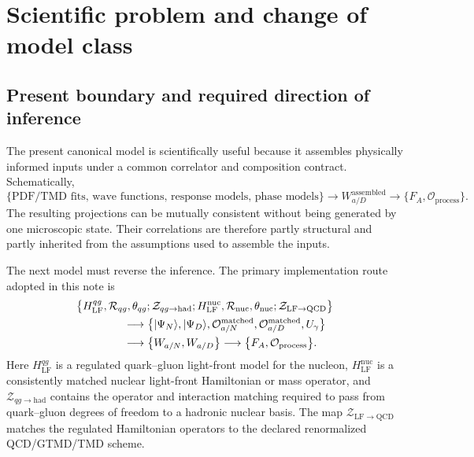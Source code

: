 \documentclass[11pt]{article}
\newcommand{\LF}{\mathrm{LF}}
\newcommand{\cO}{\mathcal O}
\newcommand{\cR}{\mathcal R}
\newcommand{\cZ}{\mathcal Z}
\begin{document}
\tableofcontents

\section{Scientific problem and change of model class}
\label{sec:problem}

\subsection{Present boundary and required direction of inference}

The present canonical model is scientifically useful because it assembles
physically informed inputs under a common correlator and composition
contract.  Schematically,
\begin{equation}
\{\text{PDF/TMD fits, wave functions, response models, phase models}\}
\longrightarrow
W^{\mathrm{assembled}}_{a/D}
\longrightarrow
\{F_A,\cO_{\mathrm{process}}\}.
\label{eq:assembled-direction}
\end{equation}
The resulting projections can be mutually consistent without being generated
by one microscopic state.  Their correlations are therefore partly
structural and partly inherited from the assumptions used to assemble the
inputs.

The next model must reverse the inference.  The primary implementation route
adopted in this note is
\begin{equation}
\begin{aligned}
&\bigl\{
H^{qg}_{\LF},\cR_{qg},\theta_{qg};
\cZ_{qg\to\mathrm{had}};
H^{\mathrm{nuc}}_{\LF},\cR_{\mathrm{nuc}},\theta_{\mathrm{nuc}};
\cZ_{\LF\to\mathrm{QCD}}
\bigr\}
\\
&\hspace{1.5cm}\longrightarrow
\bigl\{|\Psi_N\rangle,|\Psi_D\rangle,
\cO^{\mathrm{matched}}_{a/N},
\cO^{\mathrm{matched}}_{a/D},U_\gamma\bigr\}
\\
&\hspace{1.5cm}\longrightarrow
\bigl\{W_{a/N},W_{a/D}\bigr\}
\longrightarrow
\bigl\{F_A,\cO_{\mathrm{process}}\bigr\}.
\end{aligned}
\label{eq:matched-generative-direction}
\end{equation}
Here \(H^{qg}_{\LF}\) is a regulated quark--gluon light-front model for the
nucleon, \(H^{\mathrm{nuc}}_{\LF}\) is a consistently matched nuclear
light-front Hamiltonian or mass operator, and \(\cZ_{qg\to\mathrm{had}}\)
contains the operator and interaction matching required to pass from
quark--gluon degrees of freedom to a hadronic nuclear basis.  The map
\(\cZ_{\LF\to\mathrm{QCD}}\) matches the regulated Hamiltonian operators to
the declared renormalized QCD/GTMD/TMD scheme.
\end{document}
